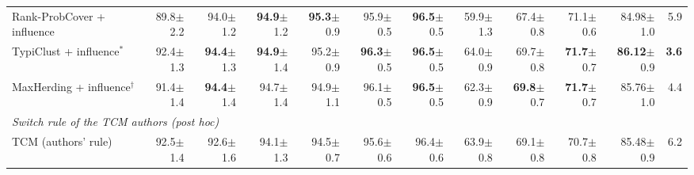 \begin{table}[t]
\begin{adjustbox}{max width=\textwidth}
\begin{tabular}{lrrrrrrrrrrr}
\quad Rank-ProbCover + influence & 89.8{\scriptsize$\pm$2.2} & 94.0{\scriptsize$\pm$1.2} & \textbf{94.9}{\scriptsize$\pm$1.2} & \textbf{95.3}{\scriptsize$\pm$0.9} & 95.9{\scriptsize$\pm$0.5} & \textbf{96.5}{\scriptsize$\pm$0.5} & 59.9{\scriptsize$\pm$1.3} & 67.4{\scriptsize$\pm$0.8} & 71.1{\scriptsize$\pm$0.6} & 84.98{\scriptsize$\pm$1.0} & 5.9 \\
\quad TypiClust + influence$^{*}$ & 92.4{\scriptsize$\pm$1.3} & \textbf{94.4}{\scriptsize$\pm$1.3} & \textbf{94.9}{\scriptsize$\pm$1.4} & 95.2{\scriptsize$\pm$0.9} & \textbf{96.3}{\scriptsize$\pm$0.5} & \textbf{96.5}{\scriptsize$\pm$0.5} & 64.0{\scriptsize$\pm$0.9} & 69.7{\scriptsize$\pm$0.8} & \textbf{71.7}{\scriptsize$\pm$0.7} & \textbf{86.12}{\scriptsize$\pm$0.9} & \textbf{3.6} \\
\quad MaxHerding + influence$^{\dagger}$ & 91.4{\scriptsize$\pm$1.4} & \textbf{94.4}{\scriptsize$\pm$1.4} & 94.7{\scriptsize$\pm$1.4} & 94.9{\scriptsize$\pm$1.1} & 96.1{\scriptsize$\pm$0.5} & \textbf{96.5}{\scriptsize$\pm$0.5} & 62.3{\scriptsize$\pm$0.9} & \textbf{69.8}{\scriptsize$\pm$0.7} & \textbf{71.7}{\scriptsize$\pm$0.7} & 85.76{\scriptsize$\pm$1.0} & 4.4 \\
\multicolumn{12}{l}{\textit{Switch rule of the TCM authors (post hoc)}} \\
\quad TCM (authors' rule)~\cite{doucet2024bridging} & 92.5{\scriptsize$\pm$1.4} & 92.6{\scriptsize$\pm$1.6} & 94.1{\scriptsize$\pm$1.3} & 94.5{\scriptsize$\pm$0.7} & 95.6{\scriptsize$\pm$0.6} & 96.4{\scriptsize$\pm$0.6} & 63.9{\scriptsize$\pm$0.8} & 69.1{\scriptsize$\pm$0.8} & 70.7{\scriptsize$\pm$0.8} & 85.48{\scriptsize$\pm$0.9} & 6.2 \\
\bottomrule
\end{tabular}
\end{adjustbox}
\end{table}
